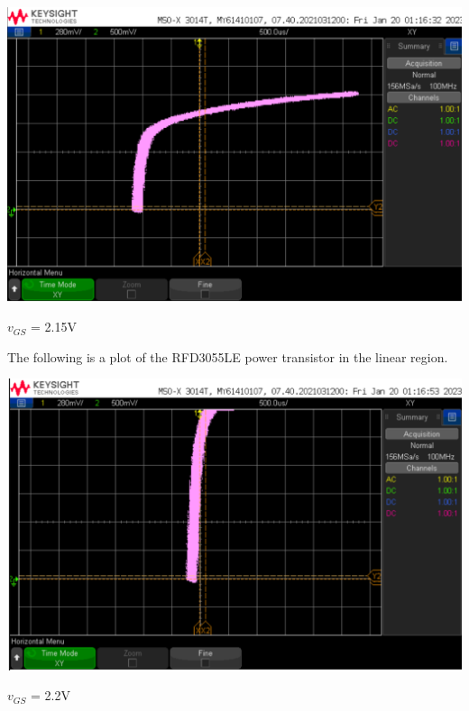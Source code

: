 \documentclass[notitlepage, 12pt]{report}  %
\begin{document}
\begin{center}
    \includegraphics[scale=0.2]{sat2.png}
\end{center}

\begin{center}
$v_{GS}$ = 2.15V \\
\end{center}

The following is a plot of the RFD3055LE power transistor in the linear region. \\

\begin{center}
    \includegraphics[scale=0.2]{linear.png}
\end{center}

\begin{center}
$v_{GS}$ = 2.2V \\
\end{center}

\newpage
\end{document}
